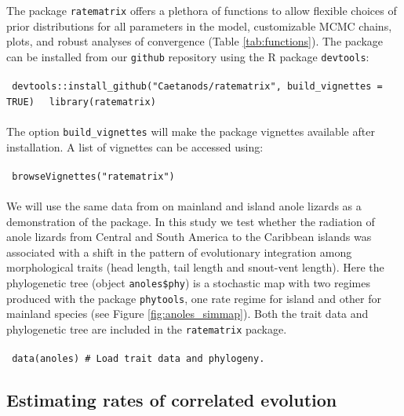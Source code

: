 The package \texttt{ratematrix} offers a plethora of functions to allow flexible choices of prior distributions for all parameters in the model, customizable MCMC chains, plots, and robust analyses of convergence (Table \ref{tab:functions}). The package can be installed from our \texttt{github} repository using the R package \texttt{devtools}:\\
\\
\hspace*{20pt} \texttt{ devtools::install\_github("Caetanods/ratematrix", build\_vignettes = TRUE) }
\hspace*{20pt} \texttt{ library(ratematrix) }\\
\\
The option \texttt{build\_vignettes} will make the package vignettes available after installation. A list of vignettes can be accessed using:\\
\\
\hspace*{20pt} \texttt{ browseVignettes("ratematrix") }\\
\\
We will use the same data from \citet{caetano_sysbio_2017} on mainland and island anole lizards as a demonstration of the package. In this study we test whether the radiation of anole lizards from Central and South America to the Caribbean islands was associated with a shift in the pattern of evolutionary integration among morphological traits (head length, tail length and snout-vent length). Here the phylogenetic tree (object \texttt{anoles\$phy}) is a stochastic map with two regimes produced with the package \texttt{phytools}, one rate regime for island and other for mainland species (see Figure \ref{fig:anoles_simmap}). Both the trait data and phylogenetic tree are included in the \texttt{ratematrix} package.\\
\\
\hspace*{20pt} \texttt{ data(anoles) \# Load trait data and phylogeny.}

\subsection{ Estimating rates of correlated evolution }

